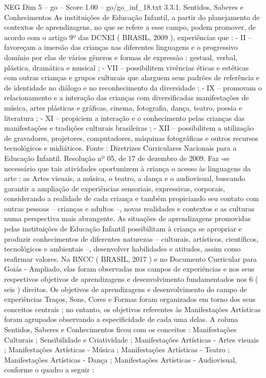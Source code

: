 \begin{textsample}{NEG Dim 5 – go – Score 1.00 – go/go\_inf\_18.txt}  \label{ex:f5_neg_279}
3.3.1.
Sentidos, Saberes e Conhecimentos As instituições de Educação Infantil, a partir do planejamento de contextos de aprendizagens, no que se refere a esse campo, podem promover, de acordo com o artigo 9º das DCNEI ( BRASIL, 2009 ), experiências que : - II – favoreçam a imersão das crianças nas diferentes linguagens e o progressivo domínio por elas de vários gêneros e formas de expressão : gestual, verbal, plástica, dramática e musical ; - VII – possibilitem vivências éticas e estéticas com outras crianças e grupos culturais que alarguem seus padrões de referência e de identidade no diálogo e no reconhecimento da diversidade ; - IX – promovam o relacionamento e a interação das crianças com diversificadas manifestações de música, artes plásticas e gráficas, cinema, fotografia, dança, teatro, poesia e literatura ; - XI – propiciem a interação e o conhecimento pelas crianças das manifestações e tradições culturais brasileiras ; - XII – possibilitem a utilização de gravadores, projetores, computadores, máquinas fotográficas e outros recursos tecnológicos e midiáticos.
Fonte : Diretrizes Curriculares Nacionais para a Educação Infantil.
Resolução nº 05, de 17 de dezembro de 2009.
Faz -se necessário que tais atividades oportunizem à criança o acesso às linguagens da arte : as Artes visuais, a música, o teatro, a dança e o audiovisual, buscando garantir a ampliação de experiências sensoriais, expressivas, corporais, considerando a realidade de cada criança e também propiciando seu contato com outras pessoas – crianças e adultos –, novas realidades e contextos e as culturas numa perspectiva mais abrangente.
As situações de aprendizagens promovidas pelas instituições de Educação Infantil possibilitam à criança se apropriar e produzir conhecimentos de diferentes naturezas – culturais, artísticos, científicos, tecnológicos e ambientais –, desenvolver habilidades e atitudes, assim como reafirmar valores.
Na BNCC ( BRASIL, 2017 ) e no Documento Curricular para Goiás - Ampliado, elas foram observadas nos campos de experiências e nos seus respectivos objetivos de aprendizagens e desenvolvimento fundamentados nos 6 ( seis ) direitos.
Os objetivos de aprendizagens e desenvolvimento do campo de experiências Traços, Sons, Cores e Formas foram organizados em torno dos seus conceitos centrais ; no entanto, os objetivos referentes às Manifestações Artísticas foram agrupados observando a especificidade de cada uma delas.
A coluna Sentidos, Saberes e Conhecimentos ficou com os conceitos : Manifestações Culturais ; Sensibilidade e Criatividade ; Manifestações Artísticas - Artes visuais ; Manifestações Artísticas - Música ; Manifestações Artísticas - Teatro ; Manifestações Artísticas - Dança ; Manifestações Artísticas - Audiovisual, conforme o quadro a seguir :

\end{textsample}
